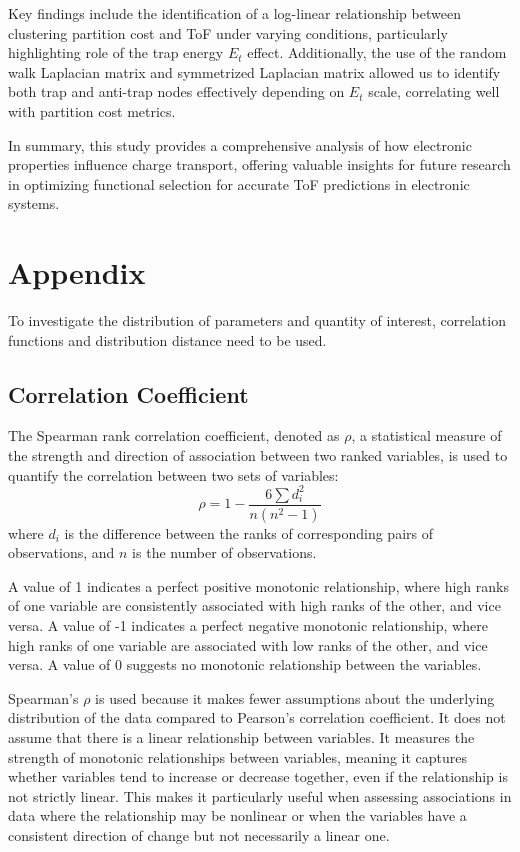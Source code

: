 \documentclass[letterpaper,12pt]{article}
\begin{document}
Key findings include the identification of a log-linear relationship between clustering partition cost and ToF under varying conditions, particularly highlighting role of the trap energy $E_t$ effect. 
Additionally, the use of the random walk Laplacian matrix and symmetrized Laplacian matrix allowed us to identify both trap and anti-trap nodes effectively depending on $E_t$ scale, correlating well with partition cost metrics. 

In summary, this study provides a comprehensive analysis of how electronic properties influence charge transport, offering valuable insights for future research in optimizing functional selection for accurate ToF predictions in electronic systems.




\section{Appendix}
\label{sec:stat}
To investigate the distribution of parameters and quantity of interest, correlation functions and distribution distance need to be used. 

\subsection{Correlation Coefficient}
The Spearman rank correlation coefficient, denoted as $\rho$, a statistical measure of the strength and direction of association between two ranked variables, is used to quantify the correlation between two sets of variables:
\begin{equation}
\rho = 1 - \frac{6 \sum d_i^2}{n(n^2 - 1)}    
\end{equation}
where $d_i$ is the difference between the ranks of corresponding pairs of observations, and
$n$ is the number of observations.

A value of 1 indicates a perfect positive monotonic relationship, where high ranks of one variable are consistently associated with high ranks of the other, and vice versa.
A value of -1 indicates a perfect negative monotonic relationship, where high ranks of one variable are associated with low ranks of the other, and vice versa.
A value of 0 suggests no monotonic relationship between the variables.

Spearman's $\rho$ is used because it makes fewer assumptions about the underlying distribution of the data compared to Pearson's correlation coefficient. It does not assume that there is a linear relationship between variables. 
It measures the strength of monotonic relationships between variables, meaning it captures whether variables tend to increase or decrease together, even if the relationship is not strictly linear. This makes it particularly useful when assessing associations in data where the relationship may be nonlinear or when the variables have a consistent direction of change but not necessarily a linear one.
\end{document}
